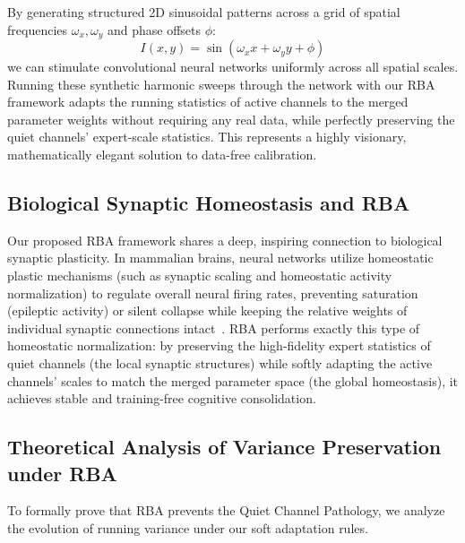 \documentclass{article}
\begin{document}
By generating structured 2D sinusoidal patterns across a grid of spatial frequencies $\omega_x, \omega_y$ and phase offsets $\phi$:
\begin{equation}
  I(x, y) = \sin(\omega_x x + \omega_y y + \phi)
\end{equation}
we can stimulate convolutional neural networks uniformly across all spatial scales. Running these synthetic harmonic sweeps through the network with our RBA framework adapts the running statistics of active channels to the merged parameter weights without requiring any real data, while perfectly preserving the quiet channels' expert-scale statistics. This represents a highly visionary, mathematically elegant solution to data-free calibration.

\subsection{Biological Synaptic Homeostasis and RBA}
Our proposed RBA framework shares a deep, inspiring connection to biological synaptic plasticity. In mammalian brains, neural networks utilize homeostatic plastic mechanisms (such as synaptic scaling and homeostatic activity normalization) to regulate overall neural firing rates, preventing saturation (epileptic activity) or silent collapse while keeping the relative weights of individual synaptic connections intact~\cite{sutskever2013on}. RBA performs exactly this type of homeostatic normalization: by preserving the high-fidelity expert statistics of quiet channels (the local synaptic structures) while softly adapting the active channels' scales to match the merged parameter space (the global homeostasis), it achieves stable and training-free cognitive consolidation.

\subsection{Theoretical Analysis of Variance Preservation under RBA}
To formally prove that RBA prevents the Quiet Channel Pathology, we analyze the evolution of running variance under our soft adaptation rules.
\end{document}
